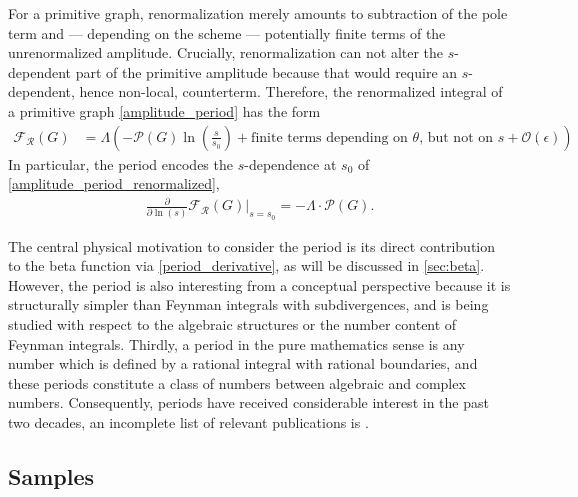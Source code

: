 \documentclass[11pt,a4paper]{article}
\newcommand{\ren} {{  \mathcal R}}
\newcommand{\period}{\mathcal P}
\renewcommand{\|}{\rule[-0.4ex]{0.2ex}{1.2em}}
\begin{document}
	For a  primitive  graph, renormalization merely amounts to subtraction of the pole term and --- depending on the scheme --- potentially finite terms of the unrenormalized amplitude. Crucially, renormalization can not alter the $s$-dependent part of the primitive amplitude because that would require an $s$-dependent, hence non-local, counterterm. Therefore, the renormalized integral of a primitive graph \cref{amplitude_period} has the form 
	\begin{align}\label{amplitude_period_renormalized} 
		\mathcal F_\ren (G) &=\Lambda \left(   - \period (G)\ln \left( \frac s {s_0}  \right)   +\text{finite terms depending on $\theta$, but not on $s$}   + \mathcal  O \left( \epsilon \right) \right).
	\end{align}
	In particular, the period encodes the $s$-dependence at $s_0$ of \cref{amplitude_period_renormalized},
	\begin{align}\label{period_derivative}
		\frac{\partial}{\partial \ln (s)} \mathcal F_\ren (G) \Big|_{s=s_0} = -\Lambda \cdot \period(G).
	\end{align}

	The central physical motivation to consider the period is its direct contribution to the beta function via \cref{period_derivative}, as will be discussed in \cref{sec:beta}. However, the period is also interesting from a conceptual perspective because it is structurally simpler than  Feynman integrals with subdivergences, and is being studied with respect to   the algebraic structures or the number content of Feynman integrals. Thirdly, a period in the pure mathematics sense is any number which is defined by a rational integral with rational boundaries, and these periods constitute a  class of numbers   between algebraic and complex numbers. Consequently,  periods have received considerable interest in the past two decades, an incomplete list of relevant publications is  \cite{kontsevich_periods_2001,belkale_periods_2003,brown_multiple_2006,schnetz_quantum_2010,brown_periods_2010,kreimer_quantum_2015,todorov_polylogarithms_2014,crump_period_2016,nasrollahpoursamami_periods_2016,crump_properties_2017,hu_further_2022,laradji_results_2021,borinsky_graphical_2022,borinsky_recursive_2022}.
	
	
	
	

\subsection{Samples}\label{sec:samples}
\end{document}
